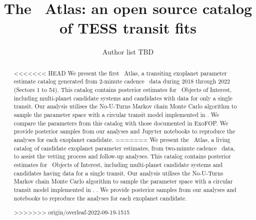 \documentclass[floatfix,ApJL,twocolumn]{aastex631}
\begin{document}
\title{The \tess\ Atlas: an open source catalog of TESS transit fits}


\author{Author list TBD}
% 





\begin{abstract}
<<<<<<< HEAD
We present the first \tess\ Atlas, a transiting exoplanet parameter estimate catalog generated from 2-minute cadence \tess\ data during 2018 through 2022 (Sectors 1 to 54).
This catalog contains posterior estimates for \red{\numAnalysed} \tess\ Objects of Interest, including \red{\numAnalysedMulti} multi-planet candidate systems and \red{\numAnalysedSingle} candidates with data for only a single transit.
Our analysis utilises the No-U-Turns Markov chain Monte Carlo algorithm to sample the parameter space with a circular transit model implemented in \exoplanet.
We compare the parameters from this catalog with those documented in ExoFOP.
We provide posterior samples from our analyses and Jupyter notebooks to reproduce the analyses for each exoplanet candidate.
=======
We present the \tess\ Atlas, a living catalog of candidate exoplanet parameter estimates, from two-minute cadence \tess\  data, to assist the vetting process and follow-up analyses.
This catalog contains posterior estimates for \red{\numAnalysed} \tess\ Objects of Interest, including \red{\numAnalysedMulti} multi-planet candidate systems and \red{\numAnalysedSingle} candidates having data for a single transit. 
Our analysis utilises the No-U-Turns Markov chain Monte Carlo algorithm to sample the parameter space with a circular transit model implemented in \exoplanet. 
. 
We provide posterior samples from our analyses and \jupyter notebooks to reproduce the analyses for each exoplanet candidate. 

>>>>>>> origin/overleaf-2022-09-19-1515
\end{abstract}

\end{document}
